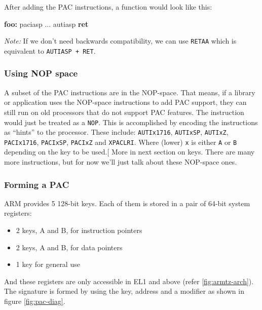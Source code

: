 \documentclass[a4paper, nobind]{templates/ociamthesis}
\providecommand{\tightlist}{%
  \setlength{\itemsep}{0pt}\setlength{\parskip}{0pt}}
\newenvironment{Shaded}{\begin{snugshade}}{\end{snugshade}}
\newcommand{\ControlFlowTok}[1]{\textcolor[rgb]{0.13,0.29,0.53}{\textbf{#1}}}
\newcommand{\FunctionTok}[1]{\textcolor[rgb]{0.13,0.29,0.53}{\textbf{#1}}}
\newcommand{\NormalTok}[1]{#1}
\renewenvironment{Shaded}
{
  \vspace{10pt}%
  \begin{snugshade}%
}{%
  \end{snugshade}%
  \vspace{8pt}%
}
\begin{document}
After adding the PAC instructions, a function would look like this:

\begin{Shaded}
\begin{Highlighting}[]
\FunctionTok{foo:}
\NormalTok{  paciasp}
\NormalTok{  ...}
\NormalTok{  autiasp}
  \ControlFlowTok{ret}
\end{Highlighting}
\end{Shaded}

\emph{Note:} If we don't need backwards compatibility, we can use \texttt{RETAA} which is equivalent to \texttt{AUTIASP\ +\ RET}.

\subsubsection{Using NOP space}\label{using-nop-space}

A subset of the PAC instructions are in the NOP-space. That means, if a
library or application uses the NOP-space instructions to add PAC support,
they can still run on old processors that do not support PAC features.
The instruction would just be treated as a \texttt{NOP}.
This is accomplished by encoding the instructions as ``hints'' to the processor.
These include: \texttt{AUTIx1716}, \texttt{AUTIxSP}, \texttt{AUTIxZ}, \texttt{PACIx1716}, \texttt{PACIxSP}, \texttt{PACIxZ} and \texttt{XPACLRI}.
Where (lower) \texttt{x} is either \texttt{A} or \texttt{B} depending on the key to be used.{[}\citeproc{ref-sipearl}{24}{]}
More in next section on keys. There are many more instructions,
but for now we'll just talk about these NOP-space ones.

\subsubsection{Forming a PAC}\label{forming-a-pac}

ARM provides 5 128-bit keys. Each of them is stored in a pair of 64-bit system registers:

\begin{itemize}
\tightlist
\item
  2 keys, A and B, for instruction pointers
\item
  2 keys, A and B, for data pointers
\item
  1 key for general use
\end{itemize}

And these registers are only accessible in EL1 and above (refer \ref{fig:armtz-arch}).
The signature is formed by using the key, address and a modifier as shown in figure \ref{fig:pac-diag}.
\end{document}
